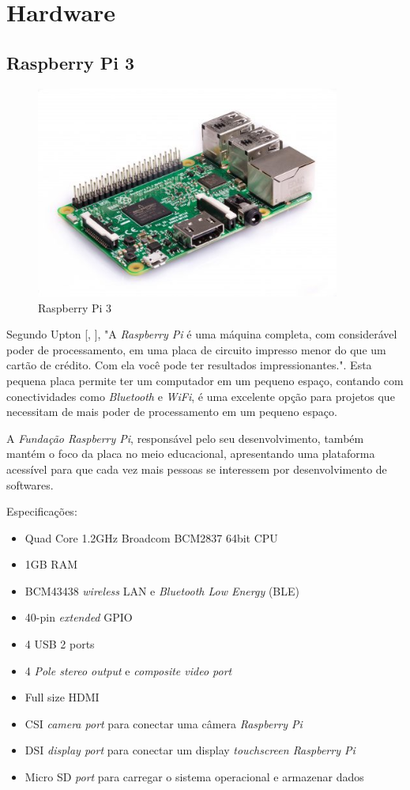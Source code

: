 \documentclass[
	12pt,				%
	oneside,			%
	a4paper,			%
	brazil				%
]{abntex2}
\newcommand{\citecustom}[1]{[\citeauthoronline{#1}, \citeyear{#1}]}
\begin{document}
\section{Hardware}

\subsection{Raspberry Pi 3}

\begin{figure}[!h]
\centering
\includegraphics[width=10cm, center]{images/raspberry-pi}
\caption{Raspberry Pi 3}
\label{Rotulo}
\end{figure}

Segundo Upton \citecustom{Upton2017}, "A \textit{Raspberry Pi} é uma máquina completa, com considerável poder de processamento, em uma placa de circuito impresso menor do que um cartão de crédito. Com ela você pode ter resultados impressionantes.". Esta pequena placa permite ter um computador em um pequeno espaço, contando com conectividades como \textit{Bluetooth} e \textit{WiFi}, é uma excelente opção para projetos que necessitam de mais poder de processamento em um pequeno espaço. 

A \textit{Fundação Raspberry Pi}, responsável pelo seu desenvolvimento, também mantém o foco da placa no meio educacional, apresentando uma plataforma acessível para que cada vez mais pessoas se interessem por desenvolvimento de softwares.

Especificações:

\begin{itemize}
\item Quad Core 1.2GHz Broadcom BCM2837 64bit CPU
\item 1GB RAM
\item BCM43438 \textit{wireless} LAN e \textit{Bluetooth Low Energy} (BLE)
\item 40-pin \textit{extended} GPIO
\item 4 USB 2 ports
\item 4 \textit{Pole stereo output} e \textit{composite video port}
\item Full size HDMI
\item CSI \textit{camera port} para conectar uma câmera \textit{Raspberry Pi}
\item DSI \textit{display port} para conectar um display \textit{touchscreen Raspberry Pi}
\item Micro SD \textit{port} para carregar o sistema operacional e armazenar dados
\end{itemize}
\end{document}
